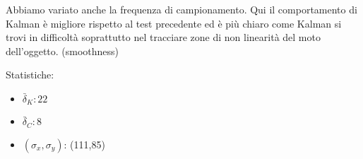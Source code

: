 Abbiamo variato anche la frequenza di campionamento.
Qui il comportamento di Kalman è migliore rispetto al test precedente ed è più chiaro come Kalman si trovi in difficoltà soprattutto nel tracciare zone di non linearità del moto dell'oggetto. (smoothness)

Statistiche:
\begin{itemize}
\item \begin{math} \bar \delta_K: 22 \end{math}
\item \begin{math} \bar \delta_C: 8\end{math}
\item \begin{math}(\sigma_x,\sigma_y)\end{math}: (111,85)
\end{itemize}

